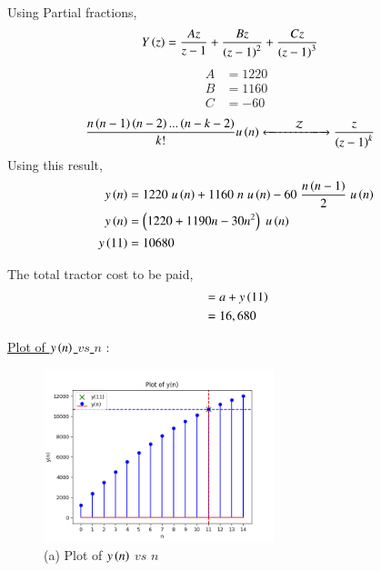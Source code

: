 \documentclass[journal,12pt,onecolumn]{IEEEtran}
\theoremstyle{remark}
\begin{document}
	\vspace{0.2cm}
	Using Partial fractions,
	\begin{align}
		Y\left(z\right) &= \dfrac{A z}{z-1} + \dfrac{B z}{\left(z-1\right)^2} + \dfrac{C z}{\left(z-1\right)^3}
	\end{align}
	\begin{align}
		A &= 1220\\
		B &= 1160\\
		C &= -60
	\end{align}
	\begin{align}
		\dfrac{n\left(n-1\right)\left(n-2\right)...\left(n-k-2\right)}{k!} u\left(n\right) &
		\xleftarrow[]{\hspace{0.8cm}{\mathcal{Z}}\hspace{0.4cm}}\xrightarrow[]{}
		\dfrac{z}{\left(z - 1\right)^k}
	\end{align}
	\vspace{-0.25cm}
	Using this result,
	\begin{align}
		y\left(n\right) &= 1220 \hspace{0.1cm} u\left(n\right) + 1160 \hspace{0.1cm} n \hspace{0.1cm} u\left(n\right) - 60 \hspace{0.1cm} \dfrac{n\left(n-1\right)}{2}\hspace{0.1cm} u\left(n\right) \\
		y\left(n\right) &= \left(1220 + 1190n - 30n^2\right) \hspace{0.1cm} u\left(n\right) \\
		y\left(11\right) &= 10680
	\end{align}
	
	The total tractor cost to be paid,
	\vspace{-0.2cm} 
	\begin{align}
		&= a + y\left(11\right)\\
		&= 16,680
	\end{align}
	
	\underline{Plot of $y\left(n\right)$ $vs$ $n$} :
	
	\begin{figure}[htbp]
		\centering
		\includegraphics[width=0.6\textwidth]{figures/Figure1.png}
		\caption*{(a) Plot of $y\left(n\right)$ $vs$ $n$}
		
	\end{figure}
\end{document}
